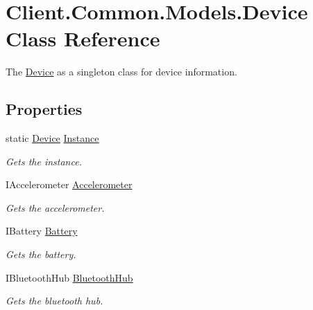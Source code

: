 \hypertarget{classClient_1_1Common_1_1Models_1_1Device}{}\section{Client.\+Common.\+Models.\+Device Class Reference}
\label{classClient_1_1Common_1_1Models_1_1Device}


The \hyperlink{classClient_1_1Common_1_1Models_1_1Device}{Device} as a singleton class for device information.  


\subsection*{Properties}
\begin{DoxyCompactItemize}
\item 
static \hyperlink{classClient_1_1Common_1_1Models_1_1Device}{Device} \hyperlink{classClient_1_1Common_1_1Models_1_1Device_a2019615475f38dea05e1afd63a87c8f9}{Instance}
\begin{DoxyCompactList}\small\item\em Gets the instance. \end{DoxyCompactList}\item 
I\+Accelerometer \hyperlink{classClient_1_1Common_1_1Models_1_1Device_a850d4b4655dfaa9ce9467ba84a9d01c7}{Accelerometer}
\begin{DoxyCompactList}\small\item\em Gets the accelerometer. \end{DoxyCompactList}\item 
I\+Battery \hyperlink{classClient_1_1Common_1_1Models_1_1Device_a8c719b6d0548aabbbf37a811267ffc8e}{Battery}
\begin{DoxyCompactList}\small\item\em Gets the battery. \end{DoxyCompactList}\item 
I\+Bluetooth\+Hub \hyperlink{classClient_1_1Common_1_1Models_1_1Device_aa60310c6baea9e6d3953dc9b6cb469d9}{Bluetooth\+Hub}
\begin{DoxyCompactList}\small\item\em Gets the bluetooth hub. \end{DoxyCompactList}\item 

\end{DoxyCompactItemize}
